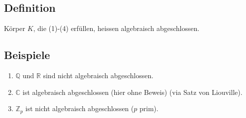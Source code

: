\documentclass[12pt,a4paper,ngerman]{scrreprt}
\begin{document}
\subsection{Definition}
Körper $K$, die (1)-(4) erfüllen, heissen algebraisch abgeschlossen.

\subsection{Beispiele}
\begin{enumerate}[(1)]
\item $\mathbb{Q}$ und $\mathbb{R}$ sind nicht algebraisch abgeschlossen.
\item $\mathbb{C}$ ist algebraisch abgeschlossen (hier ohne Beweis) (via Satz von Liouville).
\item $\mathbb{Z}_p$ ist nicht algebraisch abgeschlossen ($p$ prim).
\end{enumerate}
\end{document}
